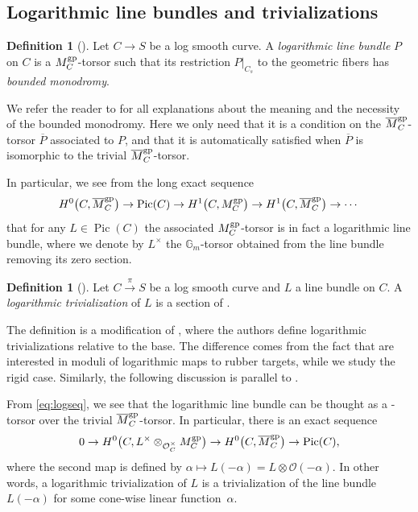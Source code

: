 \documentclass[11pt]{article}
\numberwithin{equation}{section}
\newcommand{\Pic}{\operatorname{Pic}}
\renewcommand{\O}{\mathcal{O}}
\numberwithin{equation}{section}
\theoremstyle{definition}
\newtheorem{defi}[theo]{Definition}
\begin{document}
\subsection{Logarithmic line bundles and trivializations}
\begin{defi}[\cite{molchowiselog}]
 Let $C\to S$ be a log smooth curve. A \emph{logarithmic line bundle} $P$ on $C$ is a $M_C^{\rm gp}$-torsor such that its restriction $P\rvert_{C_s}$ to the geometric fibers has \emph{bounded monodromy}.
\end{defi}
We refer the reader to \cite{molchowiselog} for all explanations about the meaning and the necessity of the bounded monodromy. Here we only need that it is a condition on the $\overline{M}_C^{\rm gp}$-torsor $\overline{P}$ associated to $P$, and that it is automatically satisfied when $\overline{P}$ is isomorphic to the trivial $\overline{M}_C^{\rm gp}$-torsor.

In particular, we see from the long exact sequence
\[H^0\bigl(C,\overline{M}_C^{\rm gp}\bigr)\to\Pic(C)\to H^1\bigl(C,M_C^{\rm gp}\bigr)\to H^1\bigl(C,\overline{M}_C^{\rm gp}\bigr)\to\cdots\]
that for any $L\in \Pic(C)$ the associated $M_C^{\rm gp}$-torsor  is in fact a logarithmic line bundle, where we denote by $L^{\times}$ the $\mathbb{G}_m$-torsor obtained from the line bundle removing its zero section.

\begin{defi}[{\cite[Definition~4.5.1]{marcuswiselog}}]
 Let $C\xrightarrow{\pi} S$ be a log smooth curve and $L$ a line bundle on $C$. A \emph{logarithmic trivialization} of $L$ is a section of .
\end{defi}
The definition is a modification of \cite[Definition~4.5.1]{marcuswiselog}, where the authors define logarithmic trivializations relative to the base. The difference comes from the fact that \cite{marcuswiselog} are interested in moduli of logarithmic maps to rubber targets, while we study the rigid case.
Similarly, the following discussion is parallel to
\cite[Proposition~4.5.3]{marcuswiselog}.

From \eqref{eq:logseq}, we see that the logarithmic line bundle  can be thought as a -torsor over the trivial $\overline{M}_C^{\rm gp}$-torsor.
In particular, there is an exact sequence
\[0\to H^0\bigl(C,L^{\times}\otimes_{\mathcal O_C^{\times}}M_C^{\rm gp}\bigr)\to H^0\bigl(C, \overline{M}_C^{\rm gp}\bigr)\to\Pic(C),
 \]
where the second map is defined by
$\alpha\mapsto L(-\alpha)=L\otimes\O(-\alpha)$.
In other words, a logarithmic trivialization of $L$ is a trivialization of the line bundle $L(-\alpha)$ for some cone-wise linear function~$\alpha$.
\end{document}
